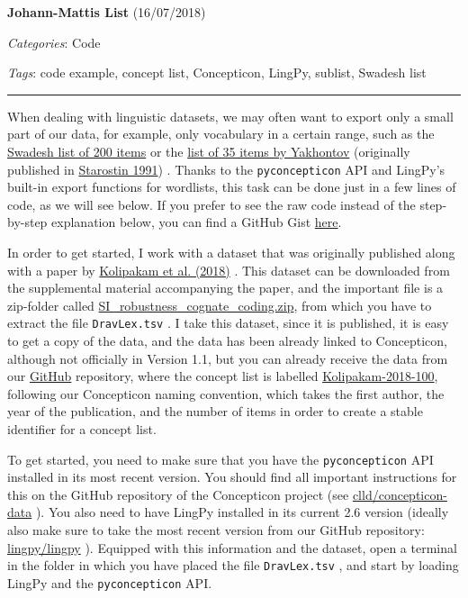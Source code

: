 \documentclass[
  english,
  a4paper,
  oneside,tablecaptionabove
]{scrbook}
\newcommand{\passthrough}[1]{#1}
\begin{document}
\textbf{Johann-Mattis List} (16/07/2018)

\emph{Categories}: Code

\emph{Tags}: code example, concept list, Concepticon, LingPy, sublist,
Swadesh list

\begin{center}\rule{0.5\linewidth}{\linethickness}\end{center}

When dealing with linguistic datasets, we may often want to export only
a small part of our data, for example, only vocabulary in a certain
range, such as the
\href{http://concepticon.clld.org/contributions/Swadesh-1952-200}{Swadesh
list of 200 items} or the
\href{http://concepticon.clld.org/contributions/Yakhontov-1991-35}{list
of 35 items by Yakhontov} (originally published in
\href{http://bibliography.lingpy.org?key=Starostin1991}{Starostin 1991})
. Thanks to the \passthrough{\lstinline!pyconcepticon!} API and LingPy's
built-in export functions for wordlists, this task can be done just in a
few lines of code, as we will see below. If you prefer to see the raw
code instead of the step-by-step explanation below, you can find a
GitHub Gist
\href{https://gist.github.com/LinguList/7804cb127e74a9263b4eab9c5af4bc6f}{here}.

In order to get started, I work with a dataset that was originally
published along with a paper by
\href{http://bibliography.lingpy.org?key=Kolipakam2018}{Kolipakam et al.
(2018)} . This dataset can be downloaded from the supplemental material
accompanying the paper, and the important file is a zip-folder called
\href{http://rsos.royalsocietypublishing.org/highwire/filestream/18890/field_highwire_adjunct_files/3/rsos171504supp4.zip}{SI\_robustness\_cognate\_coding.zip},
from which you have to extract the file
\passthrough{\lstinline!DravLex.tsv!} . I take this dataset, since it is
published, it is easy to get a copy of the data, and the data has been
already linked to Concepticon, although not officially in Version 1.1,
but you can already receive the data from our
\href{https://github.com/clld/concepticon-data}{GitHub} repository,
where the concept list is labelled
\href{https://github.com/clld/concepticon-data/blob/master/concepticondata/conceptlists/Kolipakam-2018-100.tsv}{Kolipakam-2018-100},
following our Concepticon naming convention, which takes the first
author, the year of the publication, and the number of items in order to
create a stable identifier for a concept list.

To get started, you need to make sure that you have the
\passthrough{\lstinline!pyconcepticon!} API installed in its most recent
version. You should find all important instructions for this on the
GitHub repository of the Concepticon project (see
\href{https://github.com/clld/concepticon-data}{clld/concepticon-data}
). You also need to have LingPy installed in its current 2.6 version
(ideally also make sure to take the most recent version from our GitHub
repository: \href{https://github.com/lingpy/lingpy}{lingpy/lingpy} ).
Equipped with this information and the dataset, open a terminal in the
folder in which you have placed the file
\passthrough{\lstinline!DravLex.tsv!} , and start by loading LingPy and
the \passthrough{\lstinline!pyconcepticon!} API.
\end{document}
